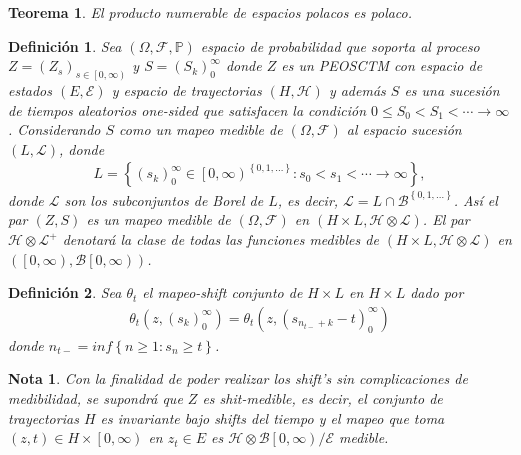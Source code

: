 \documentclass{article}
\newtheorem{Def}{Definición}[section]
\newtheorem{Teo}{Teorema}[section]
\newtheorem{Note}{Nota}[section]
\newcommand{\prob}{\mathbb{P}}
\numberwithin{equation}{section}
\begin{document}
\begin{Teo}
El producto numerable de espacios polacos es polaco.
\end{Teo}


\begin{Def}
Sea $\left(\Omega,\mathcal{F},\prob\right)$ espacio de probabilidad que soporta al proceso $Z=\left(Z_{s}\right)_{s\in\left[0,\infty\right)}$ y $S=\left(S_{k}\right)_{0}^{\infty}$ donde $Z$ es un PEOSCTM con espacio de estados $\left(E,\mathcal{E}\right)$  y espacio de trayectorias $\left(H,\mathcal{H}\right)$  y adem\'as $S$ es una sucesi\'on de tiempos aleatorios one-sided que satisfacen la condici\'on $0\leq S_{0}<S_{1}<\cdots\rightarrow\infty$. Considerando $S$ como un mapeo medible de $\left(\Omega,\mathcal{F}\right)$ al espacio sucesi\'on $\left(L,\mathcal{L}\right)$, donde 
\begin{eqnarray}
L=\left\{\left(s_{k}\right)_{0}^{\infty}\in\left[0,\infty\right)^{\left\{0,1,\ldots\right\}}:s_{0}<s_{1}<\cdots\rightarrow\infty\right\},
\end{eqnarray}
donde $\mathcal{L}$ son los subconjuntos de Borel de $L$, es decir, $\mathcal{L}=L\cap\mathcal{B}^{\left\{0,1,\ldots\right\}}$. As\'i el par $\left(Z,S\right)$ es un mapeo medible de  $\left(\Omega,\mathcal{F}\right)$ en $\left(H\times L,\mathcal{H}\otimes\mathcal{L}\right)$. El par $\mathcal{H}\otimes\mathcal{L}^{+}$ denotar\'a la clase de todas las funciones medibles de $\left(H\times L,\mathcal{H}\otimes\mathcal{L}\right)$ en $\left(\left[0,\infty\right),\mathcal{B}\left[0,\infty\right)\right)$.
\end{Def}


\begin{Def}
Sea $\theta_{t}$ el mapeo-shift conjunto de $H\times L$ en $H\times L$ dado por
\begin{eqnarray}
\theta_{t}\left(z,\left(s_{k}\right)_{0}^{\infty}\right)=\theta_{t}\left(z,\left(s_{n_{t-}+k}-t\right)_{0}^{\infty}\right)
\end{eqnarray}
donde 
$n_{t-}=inf\left\{n\geq1:s_{n}\geq t\right\}$.
\end{Def}

\begin{Note}
Con la finalidad de poder realizar los shift's sin complicaciones de medibilidad, se supondr\'a que $Z$ es shit-medible, es decir, el conjunto de trayectorias $H$ es invariante bajo shifts del tiempo y el mapeo que toma $\left(z,t\right)\in H\times\left[0,\infty\right)$ en $z_{t}\in E$ es $\mathcal{H}\otimes\mathcal{B}\left[0,\infty\right)/\mathcal{E}$ medible.
\end{Note}
\end{document}
